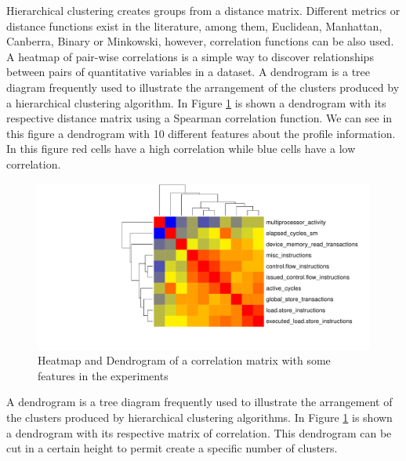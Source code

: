 Hierarchical clustering creates groups from a distance matrix. Different metrics or distance functions exist in the literature, among them, Euclidean, Manhattan, Canberra, Binary or Minkowski, however, correlation functions can be also used. A heatmap of pair-wise correlations is a simple way to discover relationships between  pairs of quantitative variables in a dataset. A dendrogram is a tree diagram frequently used to illustrate the arrangement of the clusters produced by a hierarchical clustering algorithm. In Figure \ref{fig:heatMaphClust} is shown a dendrogram with its respective distance matrix using a Spearman correlation function. We can see in this figure a dendrogram with 10 different features about the profile information. In this figure red cells have a high correlation while blue cells have a low correlation.

\begin{figure}[htpb]
    \centering
    \includegraphics[scale=.5]{./images/heatMap.pdf}
    \caption{Heatmap and Dendrogram of a correlation matrix with some features in the experiments}
    \label{fig:heatMaphClust}
\end{figure}

A dendrogram is a tree diagram frequently used to illustrate the arrangement of the clusters produced by hierarchical clustering algorithms. In Figure \ref{fig:heatMaphClust} is shown a dendrogram with its respective matrix of correlation. This dendrogram can be cut in a certain height to permit create a specific number of clusters.
